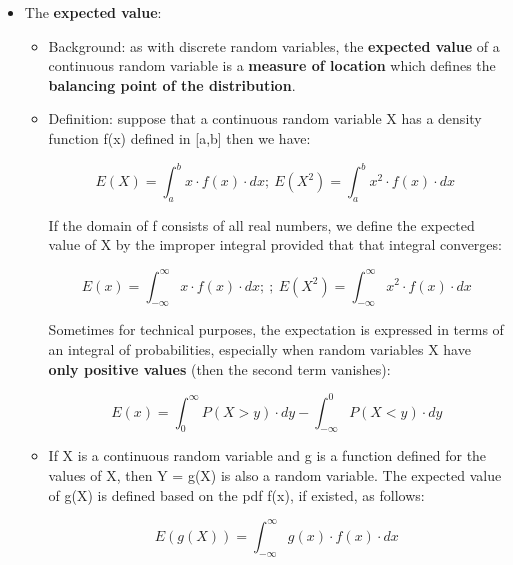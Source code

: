 \documentclass[12pt]{report}
\renewcommand{\_}{\kern-1.5pt\textunderscore\kern-1.5pt}
\begin{document}
\begin{itemize}
	\item The \textbf{expected value}:\par

\begin{itemize}
	\item Background: as with discrete random variables, the \textbf{expected value} of a continuous random variable is a \textbf{measure of location} which defines the \textbf{balancing point of the distribution}.  \par

	\item Definition: suppose that a continuous random variable X has a density function f(x) defined in [a,b] then we have:\par

 \[ E \left( X \right) = \int _{a}^{b}x \cdot f \left( x \right)  \cdot dx;~E \left( X^{2} \right) = \int _{a}^{b}x^{2} \cdot f \left( x \right)  \cdot dx~ \] \par

If the domain of f consists of all real numbers, we define the expected value of X by the improper integral provided that that integral converges:\par

 \[ E \left( x \right) = \int _{-\infty}^{\infty}x \cdot f \left( x \right)  \cdot dx;~;~E \left( X^{2} \right) = \int _{-\infty}^{\infty}x^{2} \cdot f \left( x \right)  \cdot dx \] \par

Sometimes for technical purposes, the expectation is expressed in terms of an integral of probabilities, especially when random variables X have \textbf{only positive values} (then the second term vanishes):\par

 \[ E \left( x \right) = \int _{0}^{\infty}P \left( X>y \right)  \cdot dy- \int _{-\infty}^{0}P \left( X<y \right)  \cdot dy \] \par

	\item If X is a continuous random variable and g is a function defined for the values of X, then Y = g(X) is also a random variable. The expected value of g(X) is defined based on the pdf f(x), if existed, as follows:\par

 \[ E \left( g \left( X \right)  \right) = \int _{-\infty}^{\infty}g \left( x \right)  \cdot f \left( x \right)  \cdot dx \] \par


\end{itemize}
\end{itemize}
\end{document}
